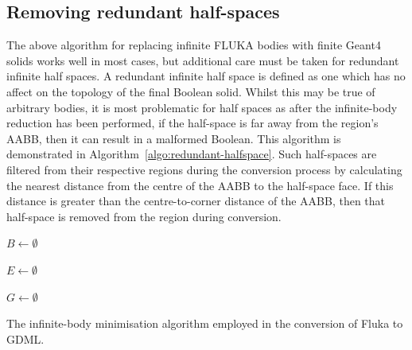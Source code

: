 \documentclass[final,5p,times,twocolumn]{elsarticle}
\begin{document}
\subsection{Removing redundant half-spaces}
The above algorithm for replacing infinite FLUKA bodies with finite
Geant4 solids works well in most cases, but additional care must be
taken for redundant infinite half spaces.  A redundant infinite half
space is defined as one which has no affect on the topology of the
final Boolean solid.  Whilst this may be true of arbitrary bodies, it
is most problematic for half spaces as after the infinite-body
reduction has been performed, if the half-space is far away from the
region's AABB, then it can result in a malformed Boolean.  This algorithm is
demonstrated in Algorithm~\ref{algo:redundant-halfspace}.  Such
half-spaces are filtered from their respective regions during the
conversion process by calculating the nearest distance from the centre
of the AABB to the half-space face.  If this distance is greater than
the centre-to-corner distance of the AABB, then that half-space is
removed from the region during conversion.

\begin{algorithm}





  $ B \longleftarrow \emptyset$

  $ E \longleftarrow \emptyset$\;

  $ G \longleftarrow \emptyset$ \;

  \label{algo:redundant-halfspace}
  \caption{The infinite-body minimisation algorithm employed in the
    conversion of Fluka to GDML.}
\end{algorithm}
\end{document}
